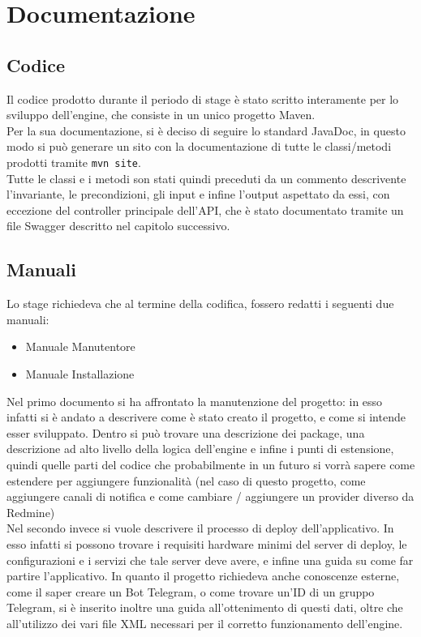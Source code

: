 
\chapter{Documentazione}
\label{cap:documentazione}
	\section{Codice}
		Il codice prodotto durante il periodo di stage è stato scritto interamente per lo sviluppo dell'engine, che consiste in un unico progetto Maven. \\
		Per la sua documentazione, si è deciso di seguire lo standard JavaDoc, in questo modo si può generare un sito con la documentazione di tutte le classi/metodi prodotti tramite \texttt{mvn site}. \\
		Tutte le classi e i metodi son stati quindi preceduti da un commento descrivente l'invariante, le precondizioni, gli input e infine l'output aspettato da essi, con eccezione del controller principale dell'API, che è stato documentato tramite un file Swagger descritto nel capitolo successivo. 
	\section{Manuali}
		Lo stage richiedeva che al termine della codifica, fossero redatti i seguenti due manuali:
		\begin{itemize}
			\item Manuale Manutentore
			\item Manuale Installazione
		\end{itemize}
		Nel primo documento si ha affrontato la manutenzione del progetto: in esso infatti si è andato a descrivere come è stato creato il progetto, e come si intende esser sviluppato. Dentro si può trovare una descrizione dei package, una descrizione ad alto livello della logica dell'engine e infine i punti di estensione, quindi quelle parti del codice che probabilmente in un futuro si vorrà sapere come estendere per aggiungere funzionalità (nel caso di questo progetto, come aggiungere canali di notifica e come cambiare / aggiungere un provider diverso da Redmine)\\
		Nel secondo invece si vuole descrivere il processo di deploy dell'applicativo. In esso infatti si possono trovare i requisiti hardware minimi del server di deploy, le configurazioni e i servizi che tale server deve avere, e infine una guida su come far partire l'applicativo. In quanto il progetto richiedeva anche conoscenze esterne, come il saper creare un Bot Telegram, o come trovare un'ID di un gruppo Telegram, si è inserito inoltre una guida all'ottenimento di questi dati, oltre che all'utilizzo dei vari file XML necessari per il corretto funzionamento dell'engine.
